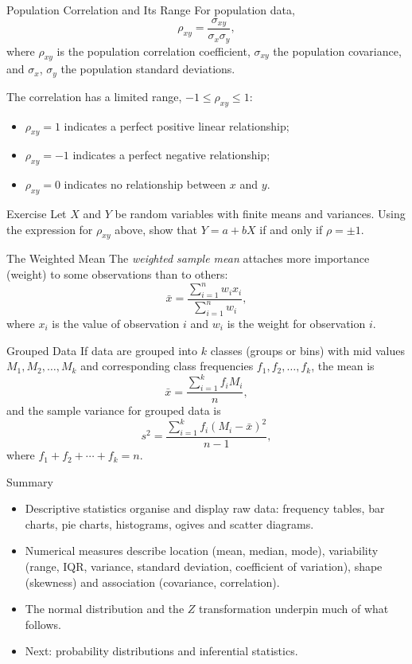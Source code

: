 \documentclass[10pt,aspectratio=169]{beamer}
\begin{document}
\begin{frame}{Population Correlation and Its Range}
  For population data,
  \[
    \rho_{xy} = \frac{\sigma_{xy}}{\sigma_x \sigma_y},
  \]
  where $\rho_{xy}$ is the population correlation coefficient, $\sigma_{xy}$ the
  population covariance, and $\sigma_x$, $\sigma_y$ the population standard
  deviations.

  The correlation has a limited range, $-1 \le \rho_{xy} \le 1$:
  \begin{itemize}
    \item $\rho_{xy} = 1$ indicates a perfect positive linear relationship;
    \item $\rho_{xy} = -1$ indicates a perfect negative relationship;
    \item $\rho_{xy} = 0$ indicates no relationship between $x$ and $y$.
  \end{itemize}

  \begin{alertblock}{Exercise}
    Let $X$ and $Y$ be random variables with finite means and variances. Using
    the expression for $\rho_{xy}$ above, show that $Y = a + bX$ if and only if
    $\rho = \pm 1$.
  \end{alertblock}
\end{frame}

\begin{frame}{The Weighted Mean}
  The \emph{weighted sample mean} attaches more importance (weight) to some
  observations than to others:
  \[
    \bar{x} = \frac{\sum_{i=1}^{n} w_i x_i}{\sum_{i=1}^{n} w_i},
  \]
  where $x_i$ is the value of observation $i$ and $w_i$ is the weight for
  observation $i$.
\end{frame}

\begin{frame}{Grouped Data}
  If data are grouped into $k$ classes (groups or bins) with mid values
  $M_1, M_2, \ldots, M_k$ and corresponding class frequencies
  $f_1, f_2, \ldots, f_k$, the mean is
  \[
    \bar{x} = \frac{\sum_{i=1}^{k} f_i M_i}{n},
  \]
  and the sample variance for grouped data is
  \[
    s^2 = \frac{\sum_{i=1}^{k} f_i (M_i - \bar{x})^2}{n-1},
  \]
  where $f_1 + f_2 + \cdots + f_k = n$.
\end{frame}

\begin{frame}{Summary}
  \begin{itemize}
    \item Descriptive statistics organise and display raw data: frequency
          tables, bar charts, pie charts, histograms, ogives and scatter
          diagrams.
    \item Numerical measures describe location (mean, median, mode), variability
          (range, IQR, variance, standard deviation, coefficient of variation),
          shape (skewness) and association (covariance, correlation).
    \item The normal distribution and the $Z$ transformation underpin much of
          what follows.
    \item Next: probability distributions and inferential statistics.
  \end{itemize}
\end{frame}
\end{document}
